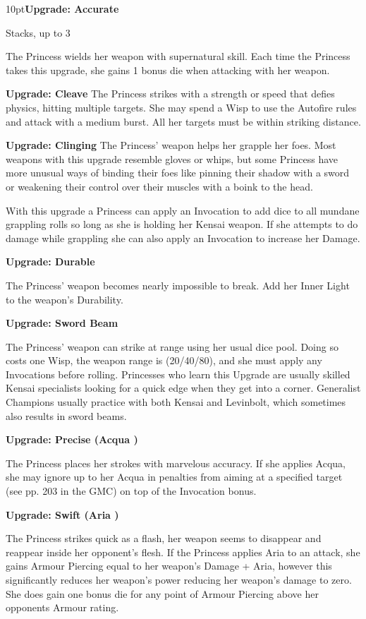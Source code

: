 \begin{myindentpar}{10pt}\textbf{Upgrade: Accurate}

Stacks, up to 3

The Princess wields her weapon with supernatural skill. Each time the Princess takes this upgrade, she gains 1 bonus die when attacking with her weapon.

\textbf{Upgrade: Cleave}
The Princess strikes with a strength or speed that defies physics, hitting multiple targets. She may spend a Wisp to use the Autofire rules and attack with a medium burst. All her targets must be within striking distance. 

\textbf{Upgrade: Clinging}
The Princess' weapon helps her grapple her foes. Most weapons with this upgrade resemble gloves or whips, but some Princess have more unusual ways of binding their foes like pinning their shadow with a sword or weakening their control over their muscles with a boink to the head. 

With this upgrade a Princess can apply an Invocation to add dice to all mundane grappling rolls so long as she is holding her Kensai weapon. If she attempts to do damage while grappling she can also apply an Invocation to increase her Damage. 

\textbf{Upgrade: Durable}

The Princess' weapon becomes nearly impossible to break. Add her Inner Light to the weapon's Durability.

\textbf{Upgrade: Sword Beam}

The Princess' weapon can strike at range using her usual dice pool. Doing so costs one Wisp, the weapon range is (20/40/80), and she must apply any Invocations before rolling. Princesses who learn this Upgrade are usually skilled Kensai specialists looking for a quick edge when they get into a corner. Generalist Champions usually practice with both Kensai and Levinbolt, which sometimes also results in sword beams.

\textbf{Upgrade: Precise (Acqua \textbullet\textbullet)}

The Princess places her strokes with marvelous accuracy. If she applies Acqua, she may ignore up to her Acqua in penalties from aiming at a specified target (see pp. 203 in the GMC) on top of the Invocation bonus.

\textbf{Upgrade: Swift (Aria \textbullet\textbullet)}

The Princess strikes quick as a flash, her weapon seems to disappear and reappear inside her opponent's flesh. If the Princess applies Aria to an attack, she gains Armour Piercing equal to her weapon's Damage + Aria, however this significantly reduces her weapon's power reducing her weapon's damage to zero. She does gain one bonus die for any point of Armour Piercing above her opponents Armour rating. 


\end{myindentpar}
